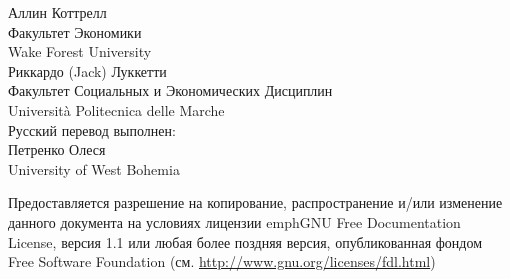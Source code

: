 \documentclass[oneside]{book}
\begin{document}
\VerbatimFootnotes
\setlength{\parindent}{0pt}
\setlength{\parskip}{1ex}
\setcounter{tocdepth}{1}


\thispagestyle{empty}

\begin{center}



{\large \sffamily
Аллин Коттрелл\\
Факультет Экономики\\
Wake Forest University\\

\vspace{20pt}
Риккардо (Jack) Луккетти\\
Факультет Социальных и Экономических Дисциплин\\
Universit\`a Politecnica delle Marche\\

\vspace{20pt}
Русский перевод выполнен:\\
Петренко Олеся\\
University of West Bohemia\\
\vspace{20pt}

}

\end{center}
\clearpage


\thispagestyle{empty}


\vspace*{2in}

Предоставляется разрешение на копирование, распространение и/или
изменение данного документа на условиях лицензии emph{GNU Free
  Documentation License}, версия 1.1 или любая более поздняя версия,
опубликованная фондом Free Software Foundation
(см. \url{http://www.gnu.org/licenses/fdl.html})

\cleardoublepage


\pagestyle{headings}

\tableofcontents

\clearpage
{}
\end{document}

